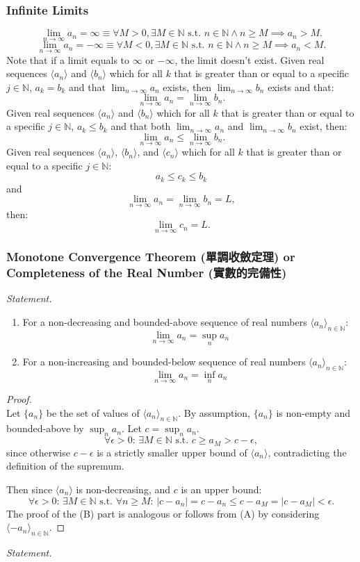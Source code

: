 \documentclass[a4paper,12pt]{report}
\begin{document}
\subsubsection{Infinite Limits}
\[\lim_{n\to \infty}a_n=\infty \equiv \forall M > 0, \exists M \in\mathbb{N} \text{\ s.t.\ } n\in\mathbb{N}\land n \geq M \implies a_n > M.\]
\[\lim_{n\to \infty}a_n=-\infty \equiv \forall M < 0, \exists M \in\mathbb{N} \text{\ s.t.\ } n\in\mathbb{N}\land n \geq M \implies a_n < M.\]
Note that if a limit equals to $\infty$ or $-\infty$, the limit doesn't exist.
Given real sequences $\langle a_n\rangle$ and $\langle b_n\rangle$ which for all $k$ that is greater than or equal to a specific $j\in \mathbb{N}$, $a_k=b_k$ and that $\lim_{n\to\infty}a_n$ exists, then $\lim_{n\to\infty}b_n$ exists and that:
\[\lim_{n\to\infty}a_n=\lim_{n\to\infty}b_n.\]
Given real sequences $\langle a_n\rangle$ and $\langle b_n\rangle$ which for all $k$ that is greater than or equal to a specific $j\in \mathbb{N}$, $a_k\leq b_k$ and that both $\lim_{n\to\infty}a_n$ and $\lim_{n\to\infty}b_n$ exist, then:
\[\lim_{n\to\infty}a_n\leq\lim_{n\to\infty}b_n.\]
Given real sequences $\langle a_n\rangle$, $\langle b_n\rangle$, and $\langle c_n\rangle$ which for all $k$ that is greater than or equal to a specific $j\in \mathbb{N}$:
\[a_k\leq c_k\leq b_k\]
and
\[\lim_{n\to\infty}a_n=\lim_{n\to\infty}b_n=L,\]
then: 
\[\lim_{n\to\infty}c_n=L.\]
\subsubsection{Monotone Convergence Theorem (單調收斂定理) or Completeness of the Real Number (實數的完備性)}
\textit{Statement.}
\begin{enumerate}[label=(\Alph*)]
\item For a non-decreasing and bounded-above sequence of real numbers $\langle a_n\rangle_{n\in\mathbb {N}}$:
\[\lim_{n\to\infty}a_n=\sup_n a_n\]
\item For a non-increasing and bounded-below sequence of real numbers $\langle a_n\rangle_{n\in\mathbb {N}}$:
\[\lim_{n\to\infty}a_n=\inf_n a_n\]
\end{enumerate}
\begin{proof}\mbox{}\\
Let $\{a_{n}\}$ be the set of values of $\langle a_n\rangle_{n\in\mathbb {N}}$. By assumption, $\{a_n\}$ is non-empty and bounded-above by $\sup_n a_n$. Let $c=\sup_n a_n$.
\[\forall\epsilon>0:\,\exists M\in\mathbb {N}\text{\ s.t.\ }c\geq a_M>c-\epsilon,\]
since otherwise $c-\epsilon$ is a strictly smaller upper bound of $\langle a_n\rangle$, contradicting the definition of the supremum. 

Then since $\langle a_n\rangle$ is non-decreasing, and $c$ is an upper bound:
\[\forall\epsilon>0:\,\exists M\in\mathbb {N}\text{\ s.t.\ }\forall n\geq M:\,|c-a_n|=c-a_n\leq c-a_M=|c-a_M|<\epsilon.\]
The proof of the (B) part is analogous or follows from (A) by considering $\langle -a_{n}\rangle_{n\in \mathbb{N}}$.
\end{proof}
\textit{Statement.}
\end{document}
